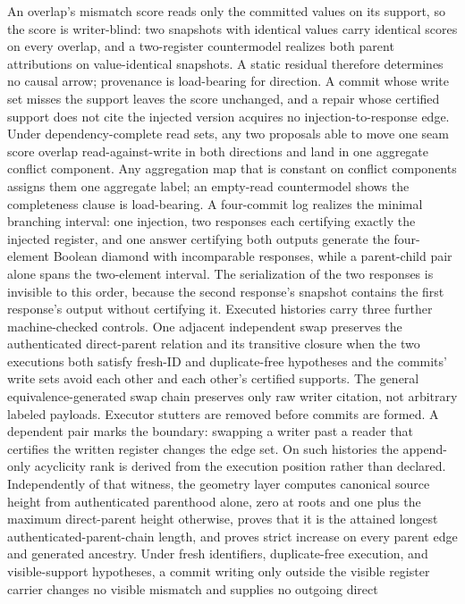 \documentclass[11pt]{article}
\theoremstyle{remark}
\theoremstyle{plain}
\begin{document}
An overlap's mismatch score reads only the committed values on its
support, so the score is writer-blind: two snapshots with identical
values carry identical scores on every overlap, and a two-register
countermodel realizes both parent attributions on value-identical
snapshots.  A static residual therefore determines no causal arrow;
provenance is load-bearing for direction.  A commit whose write set
misses the support leaves the score unchanged, and a repair whose
certified support does not cite the injected version acquires no
injection-to-response edge.  Under dependency-complete read sets, any two
proposals able to move one seam score overlap read-against-write in both
directions and land in one aggregate conflict component. Any aggregation
map that is constant on conflict components assigns them one aggregate
label; an empty-read countermodel shows the completeness clause is
load-bearing. A four-commit log realizes the
minimal branching interval: one injection, two responses each certifying
exactly the injected register, and one answer certifying both outputs
generate the four-element Boolean diamond with incomparable responses,
while a parent-child pair alone spans the two-element interval.  The
serialization of the two responses is invisible to this order, because the
second response's snapshot contains the first response's output without
certifying it. Executed histories carry three further machine-checked
controls. One adjacent independent swap preserves the authenticated
direct-parent relation and its transitive closure when the two executions
both satisfy fresh-ID and duplicate-free hypotheses and the commits' write
sets avoid each other and each other's certified supports. The general
equivalence-generated swap chain preserves only raw writer
citation, not arbitrary labeled payloads. Executor stutters are removed
before commits are formed. A dependent pair marks the boundary: swapping a
writer past a reader that certifies the written register changes the edge set. On such histories
the append-only acyclicity rank is derived from the execution position
rather than declared. Independently of that witness, the geometry layer
computes canonical source height from authenticated parenthood alone,
zero at roots and one plus the maximum direct-parent height otherwise, proves
that it is the attained longest authenticated-parent-chain length, and proves
strict increase on every parent edge and generated ancestry. Under fresh identifiers, duplicate-free execution, and
visible-support hypotheses, a commit writing only outside the visible
register carrier changes no visible mismatch and supplies no outgoing direct
\end{document}
